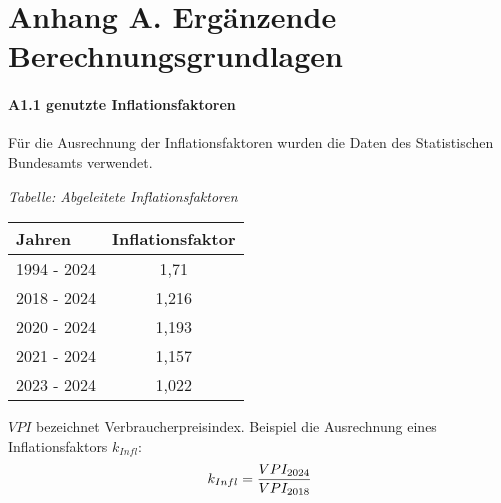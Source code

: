 \chapter*{Anhang A. Ergänzende Berechnungsgrundlagen}
\subsubsection{A1.1 genutzte Inflationsfaktoren}
Für die Ausrechnung der Inflationsfaktoren wurden die Daten des Statistischen Bundesamts \cite{destatis2025} verwendet. 
\begin{table}[h]
	{\small \textit{Tabelle: Abgeleitete Inflationsfaktoren}}
	\begin{center}
	\label{Inflationsfaktoren}
	\begin{tabular}{|l|c|}
		\hline
		\textbf{Jahren} & \textbf{Inflationsfaktor} \\ \hline
		1994 - 2024 & 1,71 \\ \hline
		2018 - 2024 & 1,216 \\ \hline
		2020 - 2024 & 1,193 \\ \hline
        2021 - 2024 & 1,157 \\ \hline
        2023 - 2024 & 1,022 \\ \hline
	\end{tabular}
    \end{center}
\end{table}

$VPI$ bezeichnet Verbraucherpreisindex. Beispiel die Ausrechnung eines Inflationsfaktors $k_{Infl}$:
\begin{equation}
	{k_{Infl}} = \frac{VPI_{2024}}{VPI_{2018}} \\
 \end{equation}


 
